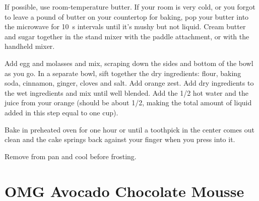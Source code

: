 If possible, use room-temperature butter. If your room is very cold, or you
forgot to leave a pound of butter on your countertop for baking, pop your butter
into the microwave for \SI{10}{\second} intervals until it's mushy but not
liquid. Cream butter and sugar together in the stand mixer with the paddle
attachment, or with the handheld mixer.

Add egg and molasses and mix, scraping down the sides and bottom of the bowl as
you go. In a separate bowl, sift together the dry ingredients: flour, baking
soda, cinnamon, ginger, cloves and salt. Add orange zest. Add dry ingredients to
the wet ingredients and mix until well blended. Add the \SI{1/2}{\cup} hot water
and the juice from your orange (should be about \SI{1/2}{\cup}, making the total
amount of liquid added in this step equal to one cup).

Bake in preheated oven for one hour or until a toothpick in the center comes out
clean and the cake springs back against your finger when you press into it.

Remove from pan and cool before frosting.

\section{OMG Avocado Chocolate Mousse
}

